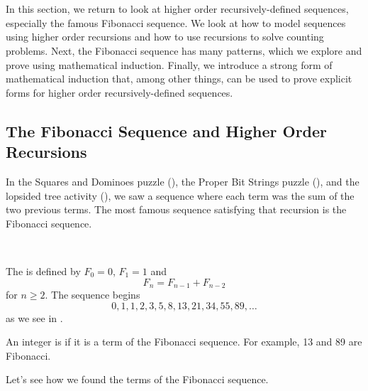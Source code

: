 \section{\secfibhigher}
\label{sec_fibonacci_higher}

In this section, we return to look at higher order recursively-defined sequences, especially the famous Fibonacci sequence.  We look at how to model sequences using higher order recursions and how to use recursions to solve counting problems.  Next, the Fibonacci sequence has many patterns, which we explore and prove using mathematical induction.  Finally, we introduce a strong form of mathematical induction that, among other things, can be used to prove explicit forms for higher order recursively-defined sequences.


\newcommand{\subfib}{The Fibonacci Sequence and Higher Order Recursions}
\subsection{\subfib}
\label{sub_fibonacci}

In the Squares and Dominoes puzzle (), the Proper Bit Strings puzzle (), and the lopsided tree activity (), we saw a sequence where each term was the sum of the two previous terms. The most famous sequence satisfying that recursion is the Fibonacci sequence.  

\begin{defn}
\label{defn_fibonacci}
~
    \begin{apart}
        \item The  is defined by $F_0=0$, $F_1=1$ and 
        $$F_n=F_{n-1}+F_{n-2}$$
        for $n \ge 2$.  The sequence begins 
        $$0,1,1,2,3,5,8,13,21,34,55,89, \ldots$$ as we see in .
        \item An integer is  if it is a term of the Fibonacci sequence.  For example, 13 and 89 are Fibonacci.
    \end{apart}
\end{defn}

Let's see how we found the terms of the Fibonacci sequence.

